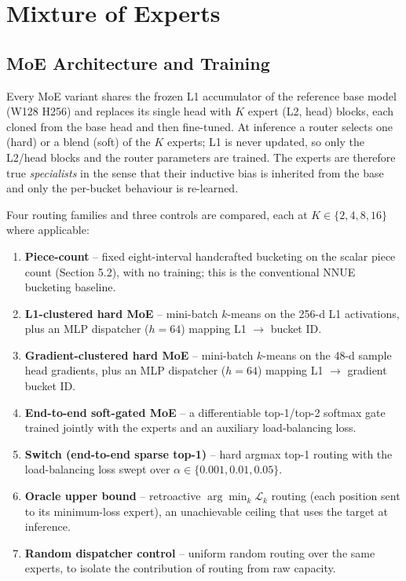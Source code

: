 \section{Mixture of Experts}

\subsection{MoE Architecture and Training}

Every MoE variant shares the frozen L1 accumulator of the reference base model (W128 H256) and replaces its single head with $K$ expert (L2, head) blocks, each cloned from the base head and then fine-tuned. At inference a router selects one (hard) or a blend (soft) of the $K$ experts; L1 is never updated, so only the L2/head blocks and the router parameters are trained. The experts are therefore true \emph{specialists} in the sense that their inductive bias is inherited from the base and only the per-bucket behaviour is re-learned.

Four routing families and three controls are compared, each at $K \in \{2,4,8,16\}$ where applicable:

\begin{enumerate}
\item \textbf{Piece-count} -- fixed eight-interval handcrafted bucketing on the scalar piece count (Section 5.2), with no training; this is the conventional NNUE bucketing baseline.
\item \textbf{L1-clustered hard MoE} -- mini-batch $k$-means on the 256-d L1 activations, plus an MLP dispatcher ($h{=}64$) mapping L1 $\rightarrow$ bucket ID.
\item \textbf{Gradient-clustered hard MoE} -- mini-batch $k$-means on the 48-d sample head gradients, plus an MLP dispatcher ($h{=}64$) mapping L1 $\rightarrow$ gradient bucket ID.
\item \textbf{End-to-end soft-gated MoE} -- a differentiable top-1/top-2 softmax gate trained jointly with the experts and an auxiliary load-balancing loss.
\item \textbf{Switch (end-to-end sparse top-1)} -- hard argmax top-1 routing with the load-balancing loss swept over $\alpha \in \{0.001, 0.01, 0.05\}$.
\item \textbf{Oracle upper bound} -- retroactive $\arg\min_k \mathcal{L}_k$ routing (each position sent to its minimum-loss expert), an unachievable ceiling that uses the target at inference.
\item \textbf{Random dispatcher control} -- uniform random routing over the same experts, to isolate the contribution of routing from raw capacity.
\end{enumerate}

